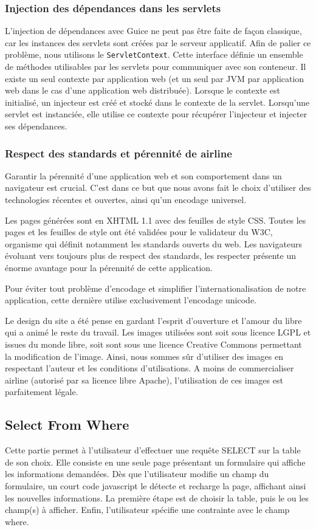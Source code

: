 \subsubsection{Injection des dépendances dans les servlets}
L'injection de dépendances avec Guice ne peut pas être faite de façon classique, car les instances des servlets sont créées par le serveur applicatif. 
Afin de palier ce problème, nous utilisons le \verb|ServletContext|. 
Cette  interface définie un ensemble de méthodes utilisables par les servlets pour communiquer avec son conteneur. 
Il existe un seul contexte par application web (et un seul par JVM par application web dans le cas d'une application web distribuée). 
Lorsque le contexte est initialisé, un injecteur est créé et stocké dans le contexte de la servlet. 
Lorsqu'une servlet est instanciée, elle utilise ce contexte pour récupérer l'injecteur et injecter ses dépendances.

\subsubsection{Respect des standards et pérennité de airline}
Garantir la pérennité d'une application web et son comportement dans un navigateur est crucial. C'est dans ce but que nous avons fait le choix d'utiliser des technologies récentes et ouvertes, ainsi qu'un encodage universel.

Les pages générées sont en XHTML 1.1 avec des feuilles de style CSS. Toutes les pages et les feuilles de style ont été validées pour le validateur du W3C, organisme qui définit notamment les standards ouverts du web. Les navigateurs évoluant vers toujours plus de respect des standards, les respecter présente un énorme avantage pour la pérennité de cette application.

Pour éviter tout problème d'encodage et simplifier l'internationalisation de notre application, cette dernière utilise exclusivement l'encodage unicode.

Le design du site a été pense en gardant l'esprit d'ouverture et l'amour du libre qui a animé le reste du travail. 
Les images utilisées sont soit sous licence LGPL et issues du monde libre, soit sont sous une licence Creative Commons permettant la modification de l'image.
Ainsi, nous sommes sûr d'utiliser des images en respectant l'auteur et les conditions d'utilisations. A moins de commercialiser airline (autorisé par sa licence libre Apache), l'utilisation de ces images est parfaitement légale.

\subsection{Select From Where}
Cette partie permet à l'utilisateur d'effectuer une requête SELECT sur la table de son choix. Elle consiste en une seule page présentant un formulaire qui affiche les informations demandées. 
Dès que l'utilisateur modifie un champ du formulaire, un court code javascript le détecte et recharge la page, affichant ainsi les nouvelles informations. La première étape est de choisir la table, puis le ou les champ(s) à afficher. Enfin, l'utilisateur spécifie une contrainte avec le champ where.

